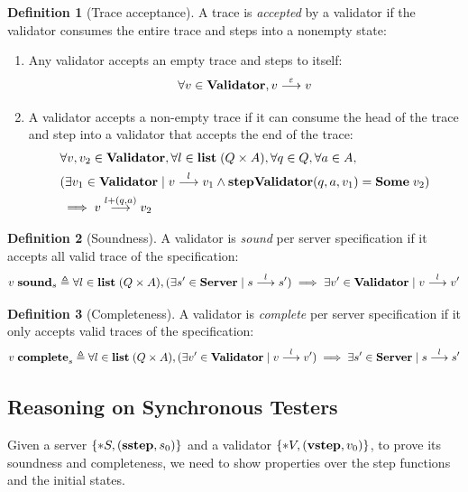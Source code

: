 \documentclass{article}
\theoremstyle{definition}
\newtheorem{definition}{Definition}
\newcommand{\existT}[2]{\{*#1,#2\}}
\newcommand{\Server}{\ottkw{Server}}
\newcommand{\Validator}{\ottkw{Validator}}
\newcommand{\stepValidator}{\ottkw{stepValidator}}
\newcommand{\sstep}{\ottkw{sstep}}
\newcommand{\vstep}{\ottkw{vstep}}
\newcommand{\Some}[1]{\ottkw{Some}\;#1}
\newcommand{\List}{\ottkw{list}\;}
\newcommand{\nil}{\varepsilon}
\newcommand{\yields}[3]{#1\overset{#2}{\longrightarrow}#3}
\newcommand{\accepts}[3]{#1\overset{#2}{\longrightarrow}#3}
\newcommand{\sound}{\ottkw{sound}}
\newcommand{\issound}[2]{#1\;\sound_{#2}}
\newcommand{\complete}{\ottkw{complete}}
\newcommand{\iscomplete}[2]{#1\;\complete_{#2}}
\begin{document}
\begin{definition}[Trace acceptance]
  A trace is {\em accepted} by a validator if the validator consumes the entire
  trace and steps into a nonempty state:
  \begin{enumerate}
  \item Any validator accepts an empty trace and steps to itself:
    \[ \forall v\in\Validator,\accepts{v}{\nil}{v} \]
  \item A validator accepts a non-empty trace if it can consume the head of the
    trace and step into a validator that accepts the end of the trace:
    \begin{align*}
      &\forall v,v_2\in\Validator,\forall
      l\in\List(Q\times A),\forall q\in Q, \forall a\in A, \\
      & (\exists v_1\in\Validator\mid\accepts{v}{l}{v_1}\wedge
      \stepValidator(q,a,v_1)=\Some{v_2}) \\ &\implies
      \accepts{v}{l+(q,a)}{v_2}
    \end{align*}
  \end{enumerate}
\end{definition}

\begin{definition}[Soundness]
  A validator is {\em sound} per server specification if it accepts all valid
  trace of the specification:
  \[ \issound{v}{s}\triangleq\forall l\in\List(Q\times A),(\exists s'\in\Server\mid\yields{s}{l}{s'})\implies\exists v'\in\Validator\mid\accepts{v}{l}{v'} \]
\end{definition}

\begin{definition}[Completeness]
  A validator is {\em complete} per server specification if it only accepts valid
  traces of the specification:
  \[ \iscomplete{v}{s}\triangleq\forall l\in \List(Q\times A),(\exists{v'}\in\Validator\mid\accepts{v}{l}{v'})\implies\exists{s'}\in\Server\mid\yields{s}{l}{s'} \]
\end{definition}

\subsection{Reasoning on Synchronous Testers}
\label{sec:sync-reasoning}

Given a server $\existT{S}{(\sstep, s_0)}$ and a validator
$\existT{V}{(\vstep,v_0)}$, to prove its soundness and completeness, we need to
show properties over the step functions and the initial states.
\end{document}
